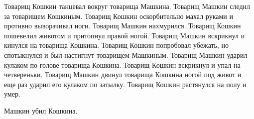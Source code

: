 Товарищ Кошкин танцевал вокруг  товарища Машкина.
Товарищ  Машкин следил за товарищем Кошкиным.
Товарищ Кошкин оскорбительно махал руками и противно выворачивал ноги.
Товарищ Машкин нахмурился. Товарищ  Кошкин пошевелил животом и притопнул правой ногой.
Товарищ Машкин вскрикнул и кинулся  на товарища Кошкина.
Товарищ  Кошкин попробовал  убежать,  но спотыкнулся и был настигнут товарищем Машкиным.
Товарищ Машкин ударил кулаком по  голове товарища Кошкина.
Товарищ  Кошкин вскрикнул и упал на четвереньки.
Товарищ  Машкин двинул товарища  Кошкина ногой под живот и еще раз ударил его кулаком по затылку.
Товарищ  Кошкин  растянулся  на  полу  и умер.

\begin{center}
    Машкин убил Кошкина.
\end{center}